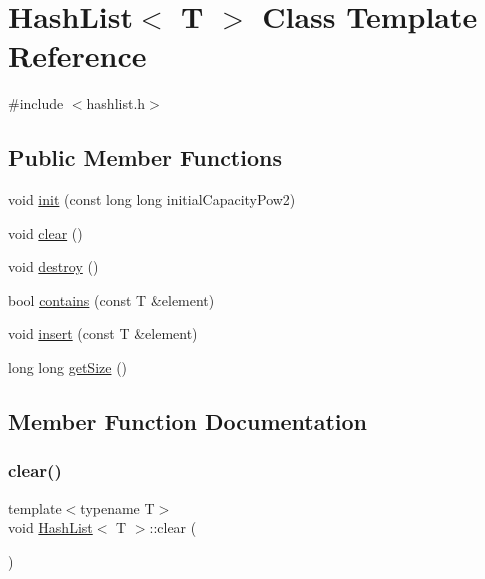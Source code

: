 \hypertarget{classHashList}{}\section{Hash\+List$<$ T $>$ Class Template Reference}
\label{classHashList}


{\ttfamily \#include $<$hashlist.\+h$>$}

\subsection*{Public Member Functions}
\begin{DoxyCompactItemize}
\item 
void \hyperlink{classHashList_a299a7932055966f85d934a62db7e7cc5}{init} (const long long initial\+Capacity\+Pow2)
\item 
void \hyperlink{classHashList_a8bff5ddb34944c843c908b77abf5aa32}{clear} ()
\item 
void \hyperlink{classHashList_a14a376c11ebe03a832d62ecf91c10560}{destroy} ()
\item 
bool \hyperlink{classHashList_af90d56617f493f45f687c461232b1cf7}{contains} (const T \&element)
\item 
void \hyperlink{classHashList_a64d7aa6809912d1cd7c4d9865d6a16ea}{insert} (const T \&element)
\item 
long long \hyperlink{classHashList_a94a4649ef9bdf27ccac0f6fc6da95334}{get\+Size} ()
\end{DoxyCompactItemize}


\subsection{Member Function Documentation}
\mbox{\label{classHashList_a8bff5ddb34944c843c908b77abf5aa32}} 
\subsubsection{\texorpdfstring{clear()}{clear()}}
{\footnotesize\ttfamily template$<$typename T$>$ \\
void \hyperlink{classHashList}{Hash\+List}$<$ T $>$\+::clear (\begin{DoxyParamCaption}{ }\end{DoxyParamCaption})\hspace{0.3cm}{\ttfamily [inline]}}

